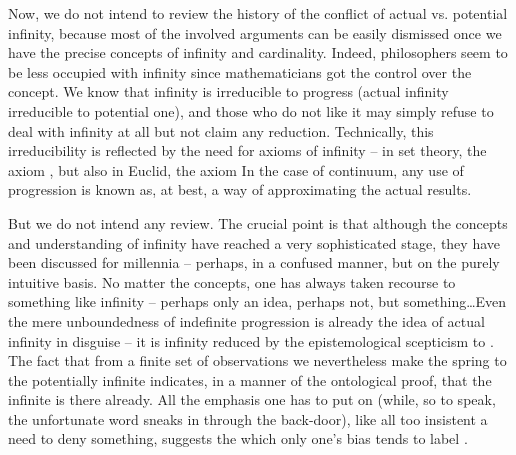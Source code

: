\pa Now, we do not intend to review the history of the conflict of actual vs.
potential infinity, because most of the involved arguments can be easily
dismissed once we have the precise concepts of infinity and
cardinality.
Indeed, philosophers seem to be less occupied with infinity since
mathematicians got the control over the concept. We know that infinity is
irreducible to progress (actual infinity irreducible to potential one), and
those who do not like it may simply refuse to deal with infinity at all but not
claim any reduction.  Technically, this irreducibility is reflected
by the need for axioms of infinity -- in set theory, the axiom , but also in Euclid, the axiom 
In the case of continuum, any use of progression is known as, at best, a way
of approximating the actual results. 

But we do not intend any review. The crucial point is that although the concepts
and understanding of infinity have reached a very sophisticated stage, they have
been discussed for millennia -- perhaps, in a confused manner, but on the purely
intuitive basis.  No matter the concepts, one has always taken recourse to
something like infinity -- perhaps only an idea, perhaps not, but
something\ldots Even the mere unboundedness of indefinite progression is already
the idea of actual infinity in disguise -- it is infinity reduced by the
epistemological scepticism to .  The fact that from a finite set of observations we nevertheless
make the spring to the potentially infinite indicates, in a manner of the
ontological proof, that the infinite is there already. All the emphasis one has
to put on  (while, so to speak, the unfortunate word
 sneaks in through the back-door), like all too insistent a need to
deny something, suggests the  which only one's bias tends 
to label .


